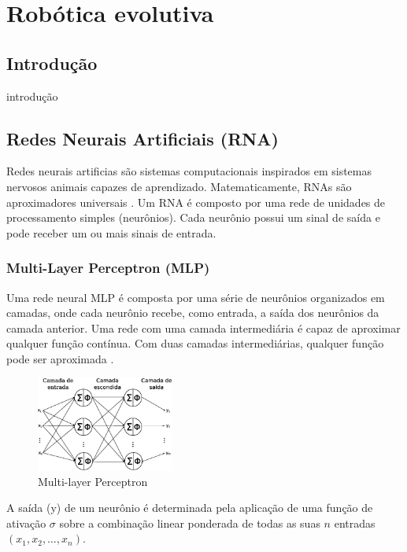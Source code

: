 \chapter{Robótica evolutiva}
\label{evolutiva}

\section{Introdução}

introdução

\section{Redes Neurais Artificiais (RNA)}

Redes neurais artificias são sistemas computacionais inspirados em sistemas
nervosos animais capazes de aprendizado. Matematicamente, RNAs são aproximadores
universais \cite{hornik89universal}. Um RNA é composto por uma rede de unidades
de processamento simples (neurônios). Cada neurônio possui um sinal de saída e
pode receber um ou mais sinais de entrada.

\subsection{Multi-Layer Perceptron (MLP)}

Uma rede neural MLP é composta por uma série de neurônios organizados em camadas, onde cada neurônio recebe, como entrada, a saída dos neurônios da camada anterior. Uma rede com uma camada intermediária é capaz de aproximar qualquer função contínua. Com duas camadas intermediárias, qualquer função pode ser aproximada \cite{cybenko89mlp}.

\begin{figure}[h]
    \centering
    \includegraphics[width=0.4\textwidth]{figures/mlp}
    \caption{Multi-layer Perceptron}
    \label{fig:mlp}
\end{figure}

A saída (y) de um neurônio é determinada pela aplicação de uma função de ativação \(\sigma\) sobre a combinação linear ponderada de todas as suas \(n\) entradas \((x_1, x_2, \dots , x_n)\).

